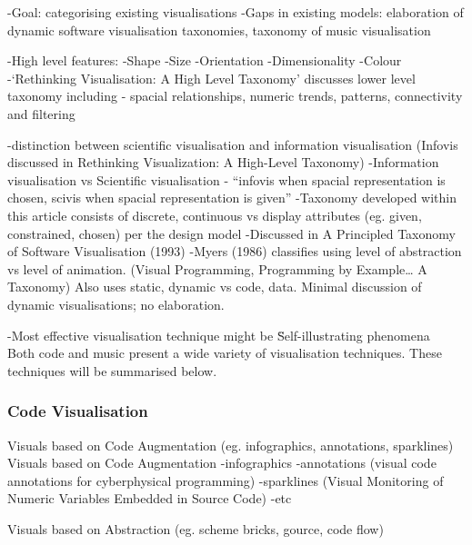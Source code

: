 -Goal: categorising existing visualisations
-Gaps in existing models: elaboration of dynamic software visualisation taxonomies, taxonomy of music visualisation

-High level features:
	-Shape
	-Size
	-Orientation
	-Dimensionality
	-Colour
-‘Rethinking Visualisation: A High Level Taxonomy' discusses lower level taxonomy including - spacial relationships, numeric trends, patterns, connectivity and filtering

-distinction between scientific visualisation and information visualisation (Infovis discussed in Rethinking Visualization: A High-Level Taxonomy)
-Information visualisation vs Scientific visualisation - “infovis when spacial representation is chosen, scivis when spacial representation is given”
-Taxonomy developed within this article consists of {discrete, continuous} vs display attributes (eg. given, constrained, chosen) per the design model
-Discussed in A Principled Taxonomy of Software Visualisation (1993)
-Myers (1986) classifies using level of abstraction vs level of animation. (Visual Programming, Programming by Example… A Taxonomy) Also uses {static, dynamic} vs {code, data}. Minimal discussion of dynamic visualisations; no elaboration.

-Most effective visualisation technique might be \"Self-illustrating phenomena\" \\

Both code and music present a wide variety of visualisation techniques. These techniques will be summarised below.


\subsubsection{Code Visualisation}

Visuals based on Code Augmentation (eg. infographics, annotations, sparklines)\\
Visuals based on Code Augmentation
-infographics
-annotations (visual code annotations for cyberphysical programming)
-sparklines (Visual Monitoring of Numeric Variables Embedded in Source Code)
-etc

Visuals based on Abstraction (eg. scheme bricks, gource, code flow)\\

